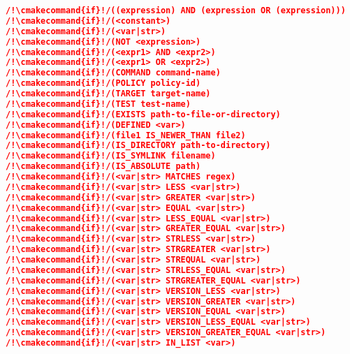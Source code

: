 \documentclass{article}
\newcommand{\cmakecommand}[1]{{\href{https://cmake.org/cmake/help/v3.13/command/#1.html}{#1}}}
\begin{document}
\begin{minipage}[t]{0.18\linewidth}
\begin{lstlisting}[language=CMake]
/!\cmakecommand{if}!/((expression) AND (expression OR (expression)))
/!\cmakecommand{if}!/(<constant>)
/!\cmakecommand{if}!/(<var|str>)
/!\cmakecommand{if}!/(NOT <expression>)
/!\cmakecommand{if}!/(<expr1> AND <expr2>)
/!\cmakecommand{if}!/(<expr1> OR <expr2>)
/!\cmakecommand{if}!/(COMMAND command-name)
/!\cmakecommand{if}!/(POLICY policy-id)
/!\cmakecommand{if}!/(TARGET target-name)
/!\cmakecommand{if}!/(TEST test-name)
/!\cmakecommand{if}!/(EXISTS path-to-file-or-directory)
/!\cmakecommand{if}!/(DEFINED <var>)
/!\cmakecommand{if}!/(file1 IS_NEWER_THAN file2)
/!\cmakecommand{if}!/(IS_DIRECTORY path-to-directory)
/!\cmakecommand{if}!/(IS_SYMLINK filename)
/!\cmakecommand{if}!/(IS_ABSOLUTE path)
/!\cmakecommand{if}!/(<var|str> MATCHES regex)
/!\cmakecommand{if}!/(<var|str> LESS <var|str>)
/!\cmakecommand{if}!/(<var|str> GREATER <var|str>)
/!\cmakecommand{if}!/(<var|str> EQUAL <var|str>)
/!\cmakecommand{if}!/(<var|str> LESS_EQUAL <var|str>)
/!\cmakecommand{if}!/(<var|str> GREATER_EQUAL <var|str>)
/!\cmakecommand{if}!/(<var|str> STRLESS <var|str>)
/!\cmakecommand{if}!/(<var|str> STRGREATER <var|str>)
/!\cmakecommand{if}!/(<var|str> STREQUAL <var|str>)
/!\cmakecommand{if}!/(<var|str> STRLESS_EQUAL <var|str>)
/!\cmakecommand{if}!/(<var|str> STRGREATER_EQUAL <var|str>)
/!\cmakecommand{if}!/(<var|str> VERSION_LESS <var|str>)
/!\cmakecommand{if}!/(<var|str> VERSION_GREATER <var|str>)
/!\cmakecommand{if}!/(<var|str> VERSION_EQUAL <var|str>)
/!\cmakecommand{if}!/(<var|str> VERSION_LESS_EQUAL <var|str>)
/!\cmakecommand{if}!/(<var|str> VERSION_GREATER_EQUAL <var|str>)
/!\cmakecommand{if}!/(<var|str> IN_LIST <var>)
\end{lstlisting}
\end{minipage}
\hfill\vline\hfill
\end{document}
